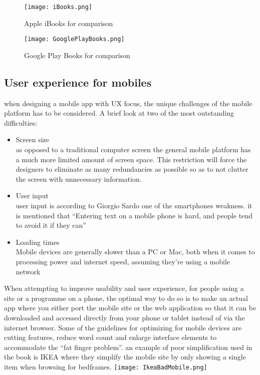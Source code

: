 \begin{figure}[h!]
\centering
\texttt{[image: iBooks.png]}
\caption{Apple iBooks for comparison}
\end{figure}

\begin{figure}[h!]
\centering
\texttt{[image: GooglePlayBooks.png]}
\caption{Google Play Books for comparison}
\end{figure}
\subsection{User experience for mobiles}
when designing a mobile app with UX focus, the unique challenges of the mobile platform has to be considered. A brief look at two of the most outstanding difficulties:
\begin{itemize}
\item Screen size\\
as opposed to a traditional computer screen the general mobile platform has a much more limited amount of screen space. This restriction will force the designers to eliminate as many redundancies as possible so as to not clutter the screen with unnecessary information. \cite{Sardo}
\item User input\\
user input is according to Giorgio Sardo one of  the smartphones weakness. it is mentioned that “Entering text on a mobile phone is hard, and people tend to avoid it if they can”\cite{Sardo}
\item Loading times\\
Mobile devices are generally slower than a PC or Mac, both when it comes to processing power and internet speed, assuming they’re using a mobile network \citep{Mobile Usability}
\end{itemize}
When attempting to improve usability and user experience, for people using a site or a programme on a phone, the optimal way to do so is to make an actual app where you either port the mobile site or the web application so that it can be downloaded and accessed directly from your phone or tablet instead of via the internet browser. 
Some of the guidelines for optimizing for mobile devices are cutting features, reduce word count and enlarge interface elements to accommodate the “fat finger problem”.\cite{Mobile Usability} an example of poor simplification used in the book is IKEA where they simplify the mobile site by only showing a single item when browsing for bedframes.
\texttt{[image: IkeaBadMobile.png]}
